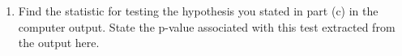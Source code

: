 \documentclass[11pt]{article}
\begin{document}
\begin{enumerate}
\begin{enumerate}
\item  Find the statistic for testing the hypothesis you stated in part (c) in the computer output. State the p-value associated with this test extracted from the output here. \\[1in]
 \end{enumerate}

\end{enumerate}
\end{document}
